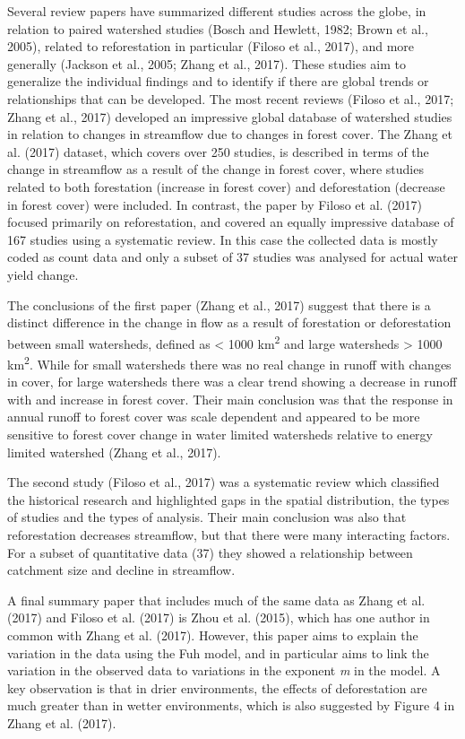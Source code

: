 \documentclass[]{elsarticle} %
\begin{document}
Several review papers have summarized different studies across the
globe, in relation to paired watershed studies (Bosch and Hewlett, 1982;
Brown et al., 2005), related to reforestation in particular (Filoso et
al., 2017), and more generally (Jackson et al., 2005; Zhang et al.,
2017). These studies aim to generalize the individual findings and to
identify if there are global trends or relationships that can be
developed. The most recent reviews (Filoso et al., 2017; Zhang et al.,
2017) developed an impressive global database of watershed studies in
relation to changes in streamflow due to changes in forest cover. The
Zhang et al. (2017) dataset, which covers over 250 studies, is described
in terms of the change in streamflow as a result of the change in forest
cover, where studies related to both forestation (increase in forest
cover) and deforestation (decrease in forest cover) were included. In
contrast, the paper by Filoso et al. (2017) focused primarily on
reforestation, and covered an equally impressive database of 167 studies
using a systematic review. In this case the collected data is mostly
coded as count data and only a subset of 37 studies was analysed for
actual water yield change.

The conclusions of the first paper (Zhang et al., 2017) suggest that
there is a distinct difference in the change in flow as a result of
forestation or deforestation between small watersheds, defined as
\textless{} 1000 km\textsuperscript{2} and large watersheds
\textgreater{} 1000 km\textsuperscript{2}. While for small watersheds
there was no real change in runoff with changes in cover, for large
watersheds there was a clear trend showing a decrease in runoff with and
increase in forest cover. Their main conclusion was that the response in
annual runoff to forest cover was scale dependent and appeared to be
more sensitive to forest cover change in water limited watersheds
relative to energy limited watershed (Zhang et al., 2017).

The second study (Filoso et al., 2017) was a systematic review which
classified the historical research and highlighted gaps in the spatial
distribution, the types of studies and the types of analysis. Their main
conclusion was also that reforestation decreases streamflow, but that
there were many interacting factors. For a subset of quantitative data
(37) they showed a relationship between catchment size and decline in
streamflow.

A final summary paper that includes much of the same data as Zhang et
al. (2017) and Filoso et al. (2017) is Zhou et al. (2015), which has one
author in common with Zhang et al. (2017). However, this paper aims to
explain the variation in the data using the Fuh model, and in particular
aims to link the variation in the observed data to variations in the
exponent \emph{m} in the model. A key observation is that in drier
environments, the effects of deforestation are much greater than in
wetter environments, which is also suggested by Figure 4 in Zhang et al.
(2017).
\end{document}
